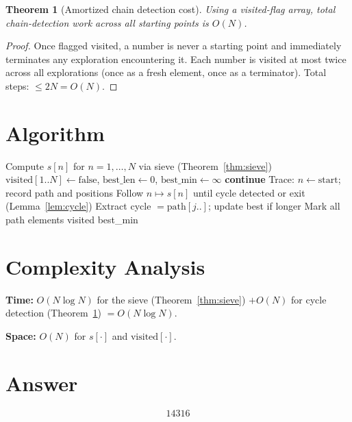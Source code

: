 \documentclass[12pt]{article}
\newtheorem{theorem}{Theorem}
\begin{document}
\begin{theorem}[Amortized chain detection cost]
\label{thm:amortized}
Using a visited-flag array, total chain-detection work across all starting points is $O(N)$.
\end{theorem}
\begin{proof}
Once flagged visited, a number is never a starting point and immediately terminates any exploration encountering it. Each number is visited at most twice across all explorations (once as a fresh element, once as a terminator). Total steps: $\le 2N = O(N)$.
\end{proof}

\section{Algorithm}

\begin{algorithm}[H]
\caption{Find longest amicable chain with elements $\le N$}
\begin{algorithmic}[1]
\STATE Compute $s[n]$ for $n = 1, \ldots, N$ via sieve (Theorem~\ref{thm:sieve})
\STATE $\text{visited}[1..N] \gets \text{false}$, $\text{best\_len} \gets 0$, $\text{best\_min} \gets \infty$
     \STATE \textbf{continue} \ENDIF
    \STATE Trace: $n \gets \text{start}$; record path and positions
    \STATE Follow $n \mapsto s[n]$ until cycle detected or exit (Lemma~\ref{lem:cycle})
        \STATE Extract cycle $= \text{path}[j..]$; update best if longer
    \ENDIF
    \STATE Mark all path elements visited
\ENDFOR
\RETURN best\_min
\end{algorithmic}
\end{algorithm}

\section{Complexity Analysis}

\textbf{Time:} $O(N \log N)$ for the sieve (Theorem~\ref{thm:sieve}) $+ O(N)$ for cycle detection (Theorem~\ref{thm:amortized}) $= O(N \log N)$.

\textbf{Space:} $O(N)$ for $s[\cdot]$ and $\text{visited}[\cdot]$.

\section{Answer}

\[
\boxed{14316}
\]
\end{document}
